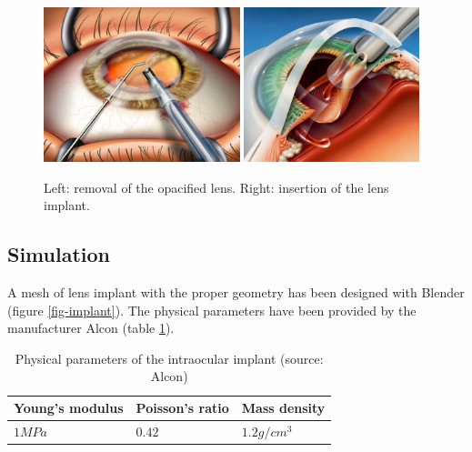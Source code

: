 \documentclass{llncs}
\begin{document}
\begin{figure}[h]
\begin{center}
\includegraphics[height=4.5cm]{images/suction}
\hspace{0.2cm}
\includegraphics[height=4.5cm]{images/deployment}
\caption [Cataract surgery] {Left: removal of the opacified lens. Right: insertion of the lens implant.}
\label{fig-surgery}
\end{center}
\end{figure}




\subsection{Simulation}

A mesh of lens implant with the proper geometry has been designed with Blender (figure \ref{fig-implant}). The physical parameters have been provided by the manufacturer Alcon (table \ref{tab-parameters}). 

\begin{table}[h!]
	\begin{center}
		\begin{tabular}{|p{3cm}|p{3cm}|p{3cm}|}
		\hline
		 \centering Young's modulus & \centering Poisson's ratio & \centering Mass density \tabularnewline
		\hline
		\centering $1 MPa$ & \centering $0.42$ & \centering $1.2 g/cm^3$ \tabularnewline
		\hline
		\end{tabular}
	\vspace{0.3cm}
	\caption{Physical parameters of the intraocular implant (source: Alcon)}
	\label{tab-parameters}
	\end{center}
\end{table}
\end{document}

